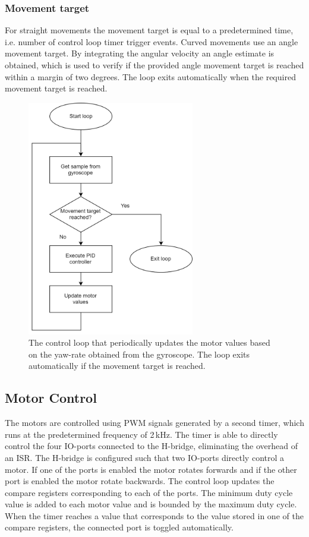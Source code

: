 \subsubsection{Movement target}

For straight movements the movement target is equal to a predetermined time, i.e. number of control loop timer trigger events.
Curved movements use an angle movement target.
By integrating the angular velocity an angle estimate is obtained, which is used to verify if the provided angle movement target is reached within a margin of two degrees.
The loop exits automatically when the required movement target is reached.

\begin{figure}[ht!]
	\centering
	\includegraphics[width=0.65\textwidth]{pics/flowchart_code.png}
	\caption{The control loop that periodically updates the motor values based on the yaw-rate obtained from the gyroscope. The loop exits automatically if the movement target is reached.}
	\label{fig:flowchart_code}
\end{figure}

\subsection{Motor Control}
The motors are controlled using PWM signals generated by a second timer, which runs at the predetermined frequency of 2\,kHz.
The timer is able to directly control the four IO-ports connected to the H-bridge, eliminating the overhead of an ISR.
The H-bridge is configured such that two IO-ports directly control a motor.
If one of the ports is enabled the motor rotates forwards and if the other port is enabled the motor rotate backwards.
The control loop updates the compare registers corresponding to each of the ports.
The minimum duty cycle value is added to each motor value and is bounded by the maximum duty cycle.
When the timer reaches a value that corresponds to the value stored in one of the compare registers, the connected port is toggled automatically.

